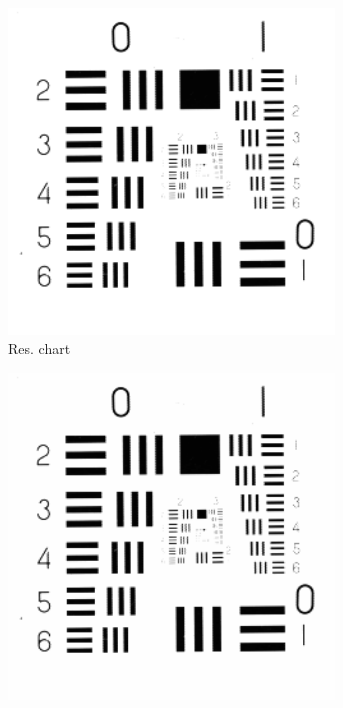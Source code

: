 \begin{figure}
\begin{subfigure}[b]{.23\textwidth}
  \centering
  \includegraphics[width=0.95\textwidth]{figures/test-images/original/resolutionchart}
  \caption{Res. chart}
  \label{fig:test-images-resolutionchart}
\end{subfigure}
\begin{subfigure}[b]{.23\textwidth}
  \centering
  \includegraphics[width=0.95\textwidth]{figures/test-images/truncate1/resolutionchart}

\end{subfigure}
\end{figure}
